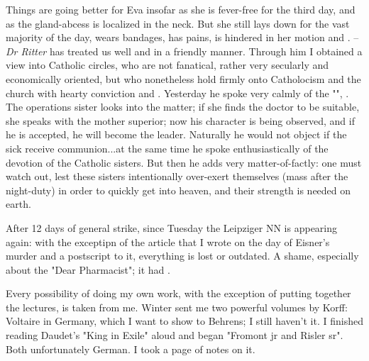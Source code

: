 
Things are going better for Eva insofar as she is fever-free for the third day, and as the gland-abcess is localized in the neck. But she still lays down for the vast majority of the day, wears bandages, has pains, is hindered in her motion and . \missing -- \textit{Dr Ritter} has treated us well and in a friendly manner. Through him I obtained a view into Catholic circles, who are not fanatical, rather very secularly and economically oriented, but who nonetheless hold firmly onto Catholocism and the church with hearty conviction and . Yesterday he spoke very calmly of the "", . The operations sister looks into the matter; if she finds the doctor to be suitable, she speaks with the mother superior; now his character is being observed, and if he is accepted, he will become the leader. Naturally he would not object if the sick receive communion...at the same time he spoke enthusiastically of the devotion of the Catholic sisters. But then he adds very matter-of-factly: one must watch out, lest these sisters intentionally over-exert themselves (mass after the night-duty) in order to quickly get into heaven, and their strength is needed on earth.

After 12 days of general strike, since Tuesday the Leipziger NN is appearing again: with the exceptipn of the article that I wrote on the day of Eisner's murder and a postscript to it, everything is lost or outdated. A shame, especially about the "Dear Pharmacist"; it had .

Every possibility of doing my own work, with the exception of putting together the lectures, is taken from me. Winter sent me two powerful volumes by Korff: Voltaire in Germany, which I want to show to Behrens; I still haven't  it. I finished reading Daudet's "King in Exile" aloud and began "Fromont jr and Risler sr". Both unfortunately German. I took a page of notes on it.

\missing

%